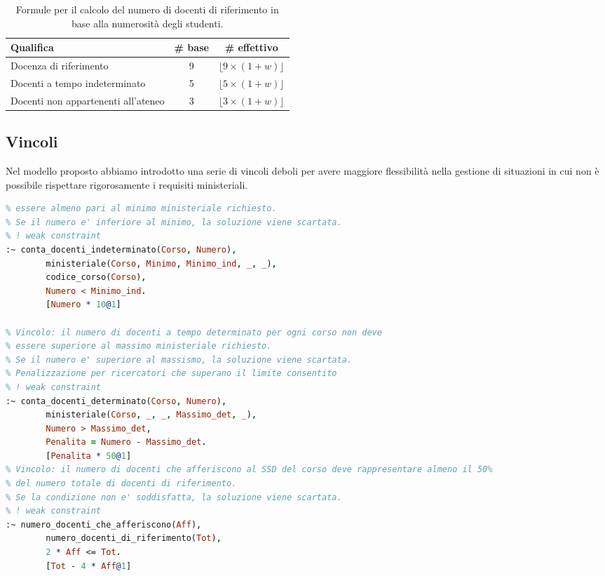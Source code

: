 \begin{table}[h]
    \centering
    \renewcommand{\arraystretch}{1.5}
    \begin{tabular}{|l|c|c|}
    \hline
    \textbf{Qualifica} & \textbf{\# base} & \textbf{\# effettivo} \\
    \hline
    Docenza di riferimento & 9 & $\lfloor 9 \times (1+w) \rfloor$ \\
    \hline
    Docenti a tempo indeterminato & 5 & $\lfloor 5 \times (1+w) \rfloor$ \\
    \hline
    Docenti non appartenenti all'ateneo & 3 & $\lfloor 3 \times (1+w) \rfloor$ \\
    \hline
    \end{tabular}
    \caption{Formule per il calcolo del numero di docenti di riferimento in base alla numerosità degli studenti.}
    \label{tab:formula-w}
\end{table}


\subsection{Vincoli}\label{sec:constraints}

Nel modello proposto abbiamo introdotto una serie di vincoli deboli per avere
maggiore flessibilità nella gestione di situazioni in cui non è possibile rispettare
rigorosamente i requisiti ministeriali.

\begin{lstlisting}[language=prolog, caption=Vincoli di flessibilità]
% Vincolo: il numero di docenti a tempo indeterminato per ogni corso deve
% essere almeno pari al minimo ministeriale richiesto.
% Se il numero e' inferiore al minimo, la soluzione viene scartata.
% ! weak constraint
:~ conta_docenti_indeterminato(Corso, Numero),
        ministeriale(Corso, Minimo, Minimo_ind, _, _),
        codice_corso(Corso),
        Numero < Minimo_ind.
        [Numero * 10@1]

% Vincolo: il numero di docenti a tempo determinato per ogni corso non deve
% essere superiore al massimo ministeriale richiesto.
% Se il numero e' superiore al massismo, la soluzione viene scartata.
% Penalizzazione per ricercatori che superano il limite consentito
% ! weak constraint
:~ conta_docenti_determinato(Corso, Numero),
        ministeriale(Corso, _, _, Massimo_det, _),
        Numero > Massimo_det,
        Penalita = Numero - Massimo_det.
        [Penalita * 50@1]
% Vincolo: il numero di docenti che afferiscono al SSD del corso deve rappresentare almeno il 50%
% del numero totale di docenti di riferimento.
% Se la condizione non e' soddisfatta, la soluzione viene scartata.
% ! weak constraint
:~ numero_docenti_che_afferiscono(Aff), 
        numero_docenti_di_riferimento(Tot),
        2 * Aff <= Tot. 
        [Tot - 4 * Aff@1]
\end{lstlisting}

